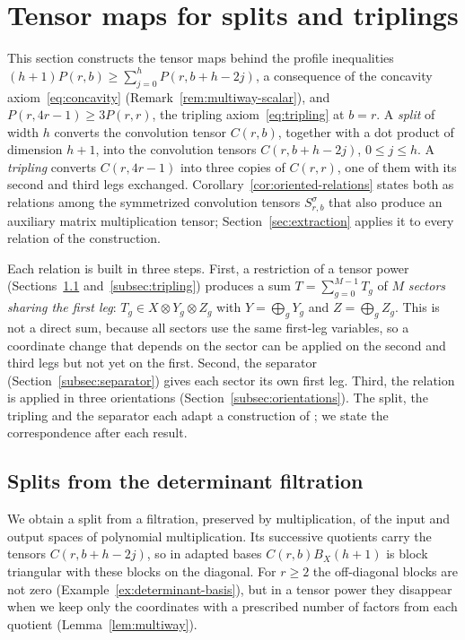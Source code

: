 \section{Tensor maps for splits and triplings}
\label{sec:maps}

This section constructs the tensor maps behind the profile inequalities
\((h+1)P(r,b)\ge\sum_{j=0}^hP(r,b+h-2j)\), a consequence of the concavity
axiom~\eqref{eq:concavity} (Remark~\ref{rem:multiway-scalar}), and
\(P(r,4r-1)\ge3P(r,r)\), the tripling axiom~\eqref{eq:tripling} at \(b=r\). A \emph{split} of width \(h\) converts the
convolution tensor \(C(r,b)\), together with a dot product of dimension
\(h+1\), into the convolution tensors \(C(r,b+h-2j)\), \(0\le j\le h\). A
\emph{tripling} converts \(C(r,4r-1)\) into three copies of \(C(r,r)\), one
of them with its second and third legs exchanged.
Corollary~\ref{cor:oriented-relations} states both as relations among the
symmetrized convolution tensors \(S^\sigma_{r,b}\) that also produce an
auxiliary matrix multiplication tensor; Section~\ref{sec:extraction}
applies it to every relation of the construction.

Each relation is built in three steps. First, a restriction of a tensor
power (Sections~\ref{subsec:splits} and~\ref{subsec:tripling}) produces a
sum \(T=\sum_{g=0}^{M-1}T_g\) of \(M\) \emph{sectors sharing the first
leg}: \(T_g\in X\otimes Y_g\otimes Z_g\) with \(Y=\bigoplus_gY_g\) and
\(Z=\bigoplus_gZ_g\). This is not a direct sum, because all sectors use the
same first-leg variables, so a coordinate change that depends on the sector
can be applied on the second and third legs but not yet on the first.
Second, the separator (Section~\ref{subsec:separator}) gives each sector
its own first leg. Third, the relation is applied in three orientations
(Section~\ref{subsec:orientations}). The split, the tripling and the
separator each adapt a construction of \citet{OAI26}; we state the
correspondence after each result.

\subsection{Splits from the determinant filtration}
\label{subsec:splits}

We obtain a split from a filtration, preserved by multiplication, of the
input and output spaces of polynomial multiplication. Its successive
quotients carry the tensors \(C(r,b+h-2j)\), so in adapted bases
\(C(r,b)B_X(h+1)\) is block triangular with these blocks on the
diagonal. For \(r\ge2\) the
off-diagonal blocks are not zero (Example~\ref{ex:determinant-basis}), but
in a tensor power they disappear when we keep only the coordinates with a
prescribed number of factors from each quotient (Lemma~\ref{lem:multiway}).

